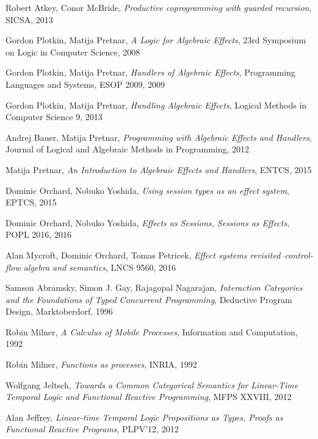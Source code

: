 \documentclass{article}
\begin{document}
\begin{thebibliography}{99}
    Robert Atkey, Conor McBride,
    \emph{Productive coprogramming with guarded recursion},
    SICSA,
    2013

    Gordon Plotkin, Matija Pretnar,
    \emph{A Logic for Algebraic Effects},
    23rd Symposium on Logic in Computer Science,
    2008

    Gordon Plotkin, Matija Pretnar,
    \emph{Handlers of Algebraic Effects},
    Programming Languages and Systems, ESOP 2009,
    2009

    Gordon Plotkin, Matija Pretnar,
    \emph{Handling Algebraic Effects},
    Logical Methods in Computer Science 9,
    2013

    Andrej Bauer, Matija Pretnar,
    \emph{Programming with Algebraic Effects and Handlers},
    Journal of Logical and Algebraic Methods in Programming,
    2012

    Matija Pretnar,
    \emph{An Introduction to Algebraic Effects and Handlers},
    ENTCS,
    2015

    Dominic Orchard, Nobuko Yoshida,
    \emph{Using session types as an effect system},
    EPTCS,
    2015

    Dominic Orchard, Nobuko Yoshida,
    \emph{Effects as Sessions, Sessions as Effects},
    POPL 2016,
    2016

    Alan Mycroft, Dominic Orchard, Tomas Petricek,
    \emph{Effect systems revisited--control-flow algebra and semantics},
    LNCS 9560,
    2016

    Samson Abramsky, Simon J. Gay, Rajagopal Nagarajan,
    \emph{Interaction Categories and the Foundations of Typed
      Concurrent Programming},
    Deductive Program Design, Marktoberdorf,
    1996

    Robin Milner,
    \emph{A Calculus of Mobile Processes},
    Information and Computation,
    1992

    Robin Milner,
    \emph{Functions as processes},
    INRIA,
    1992

    Wolfgang Jeltsch,
    \emph{Towards a Common Categorical Semantics for Linear-Time
      Temporal Logic and Functional Reactive Programming},
    MFPS XXVIII,
    2012

    Alan Jeffrey,
    \emph{Linear-time Temporal Logic Propositions as Types, Proofs as
      Functional Reactive Programs},
    PLPV'12,
    2012


\end{thebibliography}
\end{document}
